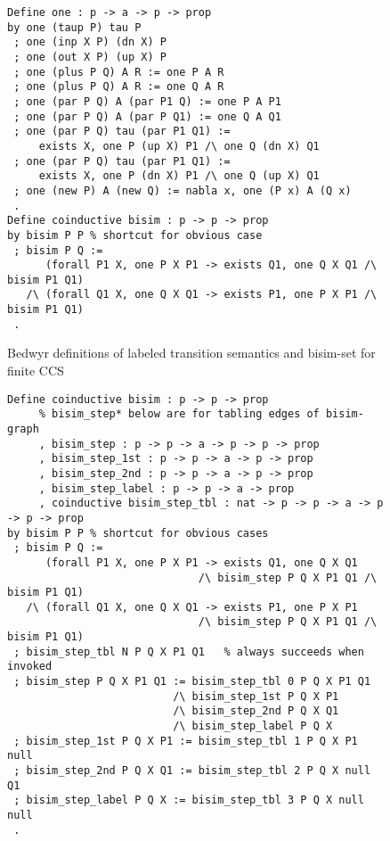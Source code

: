 \documentclass{llncs}
\begin{document}
\begin{figure}
\begin{verbatim}
Define one : p -> a -> p -> prop
by one (taup P) tau P
 ; one (inp X P) (dn X) P
 ; one (out X P) (up X) P
 ; one (plus P Q) A R := one P A R
 ; one (plus P Q) A R := one Q A R
 ; one (par P Q) A (par P1 Q) := one P A P1
 ; one (par P Q) A (par P Q1) := one Q A Q1
 ; one (par P Q) tau (par P1 Q1) :=
     exists X, one P (up X) P1 /\ one Q (dn X) Q1
 ; one (par P Q) tau (par P1 Q1) :=
     exists X, one P (dn X) P1 /\ one Q (up X) Q1
 ; one (new P) A (new Q) := nabla x, one (P x) A (Q x)
 .
Define coinductive bisim : p -> p -> prop
by bisim P P % shortcut for obvious case
 ; bisim P Q :=
      (forall P1 X, one P X P1 -> exists Q1, one Q X Q1 /\ bisim P1 Q1)
   /\ (forall Q1 X, one Q X Q1 -> exists P1, one P X P1 /\ bisim P1 Q1)
 .
\end{verbatim}
\vspace*{-4ex}
\caption{Bedwyr definitions of labeled transition semantics and
  bisim-set for finite CCS}
\label{fig:ccsone}
\end{figure}


\begin{figure}
\begin{verbatim}
Define coinductive bisim : p -> p -> prop
     % bisim_step* below are for tabling edges of bisim-graph
     , bisim_step : p -> p -> a -> p -> p -> prop
     , bisim_step_1st : p -> p -> a -> p -> prop
     , bisim_step_2nd : p -> p -> a -> p -> prop
     , bisim_step_label : p -> p -> a -> prop
     , coinductive bisim_step_tbl : nat -> p -> p -> a -> p -> p -> prop
by bisim P P % shortcut for obvious cases
 ; bisim P Q :=
      (forall P1 X, one P X P1 -> exists Q1, one Q X Q1
                              /\ bisim_step P Q X P1 Q1 /\ bisim P1 Q1)
   /\ (forall Q1 X, one Q X Q1 -> exists P1, one P X P1
                              /\ bisim_step P Q X P1 Q1 /\ bisim P1 Q1)
 ; bisim_step_tbl N P Q X P1 Q1   % always succeeds when invoked
 ; bisim_step P Q X P1 Q1 := bisim_step_tbl 0 P Q X P1 Q1
                          /\ bisim_step_1st P Q X P1
                          /\ bisim_step_2nd P Q X Q1
                          /\ bisim_step_label P Q X
 ; bisim_step_1st P Q X P1 := bisim_step_tbl 1 P Q X P1 null
 ; bisim_step_2nd P Q X Q1 := bisim_step_tbl 2 P Q X null Q1
 ; bisim_step_label P Q X := bisim_step_tbl 3 P Q X null null
 .
\end{verbatim}
\label{fig:ccsbisim}
\end{figure}
\end{document}
